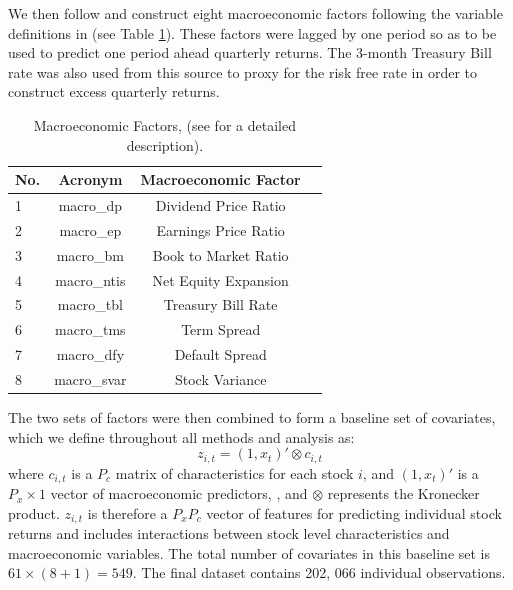 \documentclass{article}
\begin{document}
We then follow \cite{gu_empirical_2019} and construct eight macroeconomic factors following the variable definitions in \cite{welch_comprehensive_2008} (see Table \ref{macro_factors}). These factors were lagged by one period so as to be used to predict one period ahead quarterly returns. The 3-month Treasury Bill rate was also used from this source to proxy for the risk free rate in order to construct excess quarterly returns. 
\begin{table}
	\caption{Macroeconomic Factors, (see \cite{welch_comprehensive_2008} for a detailed description).}
	\label{macro_factors}
	\begin{center}
		\begin{tabular}{lccc} \hline
			No. & Acronym & Macroeconomic Factor \\ \hline
			1 & macro\_dp & Dividend Price Ratio \\
			2 & macro\_ep & Earnings Price Ratio \\
			3 & macro\_bm & Book to Market Ratio \\
			4 & macro\_ntis & Net Equity Expansion \\
			5 & macro\_tbl & Treasury Bill Rate \\
			6 & macro\_tms & Term Spread \\
			7 & macro\_dfy & Default Spread \\
			8 & macro\_svar & Stock Variance \\ \hline
		\end{tabular}
	\end{center}
\end{table}
The two sets of factors were then combined to form a baseline set of covariates, which we define throughout all methods and analysis as:
\begin{equation}
z_{i,t} = (1, x_t)' \otimes c_{i, t}
\end{equation}
where $c_{i,t}$ is a $P_c$ matrix of characteristics for each stock $i$, and $(1, x_t)'$ is a $P_x \times 1$ vector of macroeconomic predictors, , and $\otimes$ represents the Kronecker product. $z_{i,t}$ is therefore a $P_x P_c$ vector of features for predicting individual stock returns and includes interactions between stock level characteristics and macroeconomic variables. The total number of covariates in this baseline set is $61 \times (8 + 1) = 549$. The final dataset contains 202, 066 individual observations. 
\end{document}
